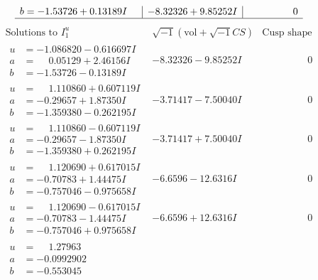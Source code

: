 \documentclass[1p]{elsarticle_modified}
\theoremstyle{definition}
\newcommand{\I}{\sqrt{-1}}
\begin{document}
$$\begin{array}{c|c|c}
\begin{aligned}
b &= -1.53726 + 0.13189 I\end{aligned}
 & -8.32326 + 9.85252 I & \phantom{-0.000000 } 0\\
 \hline 
 \end{array}$$\newpage$$\begin{array}{c|c|c}  
\text{Solutions to }I^u_{1}& \I (\text{vol} + \sqrt{-1}CS) & \text{Cusp shape}\\
 \hline 
\begin{aligned}
u &= -1.086820 - 0.616697 I \\
a &= \phantom{-}0.05129 + 2.46156 I \\
b &= -1.53726 - 0.13189 I\end{aligned}
 & -8.32326 - 9.85252 I & \phantom{-0.000000 } 0 \\ \hline\begin{aligned}
u &= \phantom{-}1.110860 + 0.607119 I \\
a &= -0.29657 + 1.87350 I \\
b &= -1.359380 - 0.262195 I\end{aligned}
 & -3.71417 - 7.50040 I & \phantom{-0.000000 } 0 \\ \hline\begin{aligned}
u &= \phantom{-}1.110860 - 0.607119 I \\
a &= -0.29657 - 1.87350 I \\
b &= -1.359380 + 0.262195 I\end{aligned}
 & -3.71417 + 7.50040 I & \phantom{-0.000000 } 0 \\ \hline\begin{aligned}
u &= \phantom{-}1.120690 + 0.617015 I \\
a &= -0.70783 + 1.44475 I \\
b &= -0.757046 - 0.975658 I\end{aligned}
 & -6.6596 - 12.6316 I & \phantom{-0.000000 } 0 \\ \hline\begin{aligned}
u &= \phantom{-}1.120690 - 0.617015 I \\
a &= -0.70783 - 1.44475 I \\
b &= -0.757046 + 0.975658 I\end{aligned}
 & -6.6596 + 12.6316 I & \phantom{-0.000000 } 0 \\ \hline\begin{aligned}
u &= \phantom{-}1.27963\phantom{ +0.000000I} \\
a &= -0.0992902\phantom{ +0.000000I} \\
b &= -0.553045\phantom{ +0.000000I}\end{aligned}

\end{array}$$
\end{document}
